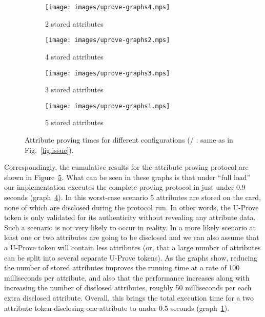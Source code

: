 \begin{figure}[ht]
  \centering
  \begin{subfigure}[b]{0.45\textwidth}
    \texttt{[image: images/uprove-graphs4.mps]}
    \caption{2 stored attributes}
    \label{fig:2attr}
  \end{subfigure}
  \begin{subfigure}[b]{0.45\textwidth}
    \texttt{[image: images/uprove-graphs2.mps]}
    \caption{4 stored attributes}
    \label{fig:4attr}
  \end{subfigure}

  \begin{subfigure}[b]{0.45\textwidth}
    \texttt{[image: images/uprove-graphs3.mps]}
    \caption{3 stored attributes}
    \label{fig:3attr}
  \end{subfigure}
  \begin{subfigure}[b]{0.45\textwidth}
    \texttt{[image: images/uprove-graphs1.mps]}
    \caption{5 stored attributes}
    \label{fig:5attr}
  \end{subfigure}

  \caption[Attribute proving times for different configurations.]{
    Attribute proving times for different configurations
    (/%
     : same as in Fig.~\ref{fig:issue}).}
  \label{fig:total}
\end{figure}

Correspondingly, the cumulative results for the attribute proving protocol are
shown in Figure~\ref{fig:total}. What can be seen in these graphs is that under
``full load'' our implementation executes the complete proving protocol in just
under 0.9 seconds (graph~\ref{fig:5attr}). In this worst-case scenario 5
attributes are stored on the card, none of which are disclosed during the
protocol run. In other words, the U-Prove token is only validated for its
authenticity without revealing any attribute data. Such a scenario is not very
likely to occur in reality. In a more likely scenario at least one or two
attributes are going to be disclosed and we can also assume that a U-Prove token
will contain less attributes (or, that a large number of attributes can be split
into several separate U-Prove tokens). As the graphs show, reducing the number
of stored attributes improves the running time at a rate of 100 milliseconds per
attribute, and also that the performance increases along with increasing the
number of disclosed attributes, roughly 50 milliseconds per each extra disclosed
attribute. Overall, this brings the total execution time for a two attribute
token disclosing one attribute to under 0.5 seconds (graph~\ref{fig:2attr}).

